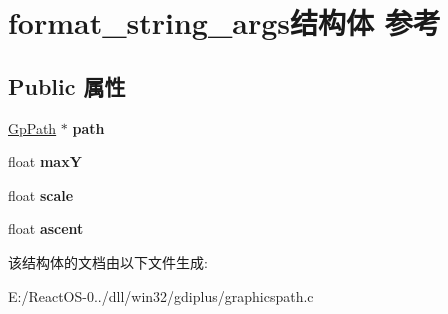 \hypertarget{structformat__string__args}{}\section{format\+\_\+string\+\_\+args结构体 参考}
\label{structformat__string__args}
\subsection*{Public 属性}
\begin{DoxyCompactItemize}
\item 
\mbox{\label{structformat__string__args_add5b2922eabc791cb38081d4d724653b}} 
\hyperlink{struct_gp_path}{Gp\+Path} $\ast$ {\bfseries path}
\item 
\mbox{\label{structformat__string__args_ab0c8fcbc4ea6c5576426d48e61e326d4}} 
float {\bfseries maxY}
\item 
\mbox{\label{structformat__string__args_ae873a6be72e679f5a517a5ffb8606311}} 
float {\bfseries scale}
\item 
\mbox{\label{structformat__string__args_ae84419a55c64dfde8d3d6c2509dc5a75}} 
float {\bfseries ascent}
\end{DoxyCompactItemize}


该结构体的文档由以下文件生成\+:\begin{DoxyCompactItemize}
\item 
E\+:/\+React\+O\+S-\/0../dll/win32/gdiplus/graphicspath.\+c\end{DoxyCompactItemize}
